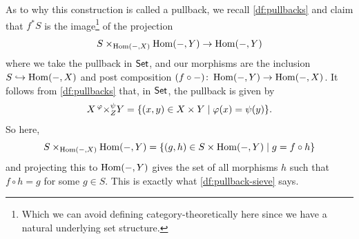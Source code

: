         As to why this construction is called a pullback, we recall \cref{df:pullbacks} and claim that $f^* S$ is the image\footnote{
            Which we can avoid defining category-theoretically here since we have a natural underlying set structure.
        } of the projection
        \begin{equation*}
            S\times_{\operatorname{Hom}({-}, X)}\operatorname{Hom}({-}, Y) \to \operatorname{Hom}({-}, Y)
        \end{equation*}
        where we take the pullback in $\mathsf{Set}$, and our morphisms are the inclusion $S\hookrightarrow\operatorname{Hom}({-}, X)$ and post composition $(f\circ{-})\colon\operatorname{Hom}({-}, Y)\to\operatorname{Hom}({-}, X)$.
        It follows from \cref{df:pullbacks} that, in $\mathsf{Set}$, the pullback is given by
        \begin{equation*}
            X\prescript{\varphi}{}{\times}^\psi_Z Y = \{(x,y)\in X\times Y \mid \varphi(x)=\psi(y)\}.
        \end{equation*}
        So here,
        \begin{equation*}
            S\times_{\operatorname{Hom}({-}, X)}\operatorname{Hom}({-}, Y) = \{(g,h)\in S\times\operatorname{Hom}({-}, Y) \mid g=f\circ h\}
        \end{equation*}
        and projecting this to $\operatorname{Hom}({-}, Y)$ gives the set of all morphisms $h$ such that $f\circ h=g$ for some $g\in S$.
        This is exactly what \cref{df:pullback-sieve} says.

